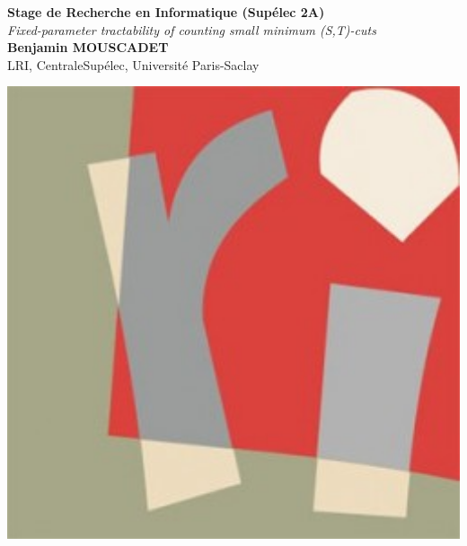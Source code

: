 \documentclass[a0,portrait]{a0poster}
\begin{document}


\begin{minipage}[b]{0.75\linewidth}
\veryHuge \color{NavyBlue} \textbf{Stage de Recherche en Informatique (Sup\'e{}lec 2A)} \color{Black}\\ %
\Huge\textit{Fixed-parameter tractability of counting small minimum (S,T)-cuts }\\[18mm] %
\huge \textbf{Benjamin MOUSCADET}\\[0.5cm] %
\huge LRI, CentraleSupélec, Université Paris-Saclay\\[0.4cm] %
\end{minipage}
%
\begin{minipage}[b]{0.25\linewidth}
\includegraphics[width=15cm]{logo_lri.jpg}\\
\end{minipage}
\end{document}
